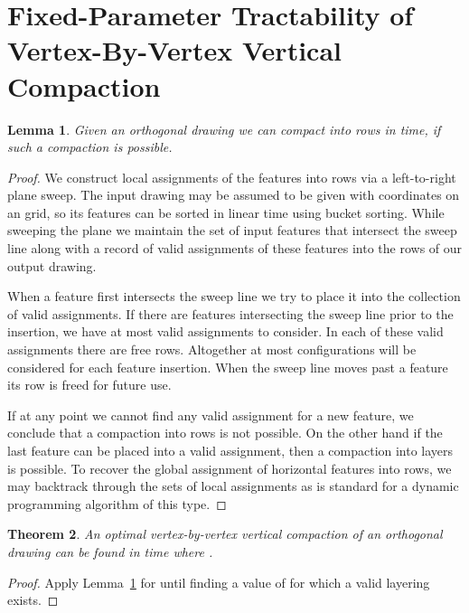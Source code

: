 \documentclass[12pt]{article}
\newtheorem{theorem}{Theorem}
\newtheorem{lemma}[theorem]{Lemma}
\theoremstyle{definitions}
\begin{document}
\section{Fixed-Parameter Tractability of \\Vertex-By-Vertex Vertical Compaction}

\begin{lemma}
\label{lem:fpt-fixed-num-of-layers}
Given an orthogonal drawing  we can  compact  into  rows
in  time, if such a compaction is possible.
\end{lemma}
\begin{proof}
We construct local assignments of the features into  rows via a left-to-right plane sweep. The input drawing may be assumed to be given with coordinates on an  grid, so its features can be sorted in linear time using bucket sorting. While sweeping the plane we maintain the set of input features that intersect the sweep line along with a record of valid assignments of these features into the  rows of our output drawing.

When a feature first intersects the sweep line we try to place it into the collection of valid assignments. If there are  features intersecting the sweep line prior to the insertion, we have at most  valid assignments to consider. In each of these valid assignments there are  free rows. Altogether at most  configurations will be considered for each feature insertion. When the sweep line moves past a feature its row is freed for future use.

If at any point we cannot find any valid assignment for a new feature, we conclude that a compaction into  rows is not possible. On the other hand if the last feature can be placed into a valid assignment, then a compaction into  layers is possible. To recover the global assignment of horizontal features into rows, we may backtrack through the sets of  local assignments as is standard for a dynamic programming algorithm of this type.
\end{proof}

\begin{theorem}
An optimal vertex-by-vertex vertical compaction of an orthogonal drawing  can be found in  time where .
\end{theorem}

\begin{proof}
Apply Lemma~\ref{lem:fpt-fixed-num-of-layers} for  until finding a value of  for which a valid layering exists.
\end{proof}
\end{document}
